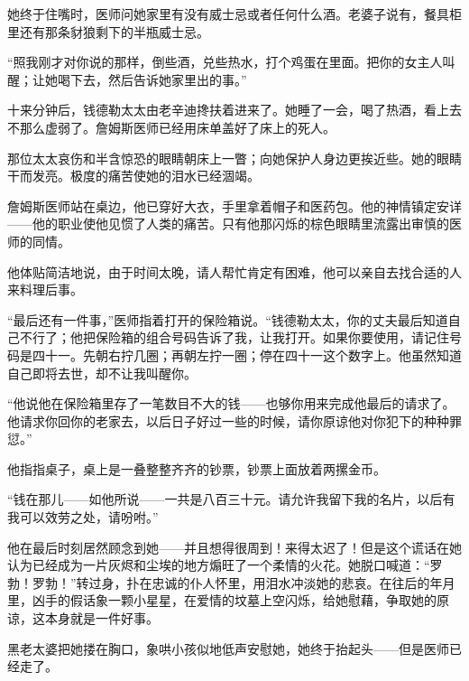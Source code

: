 \documentclass{article}
\begin{document}
她终于住嘴时，医师问她家里有没有威士忌或者任何什么酒。老婆子说有，餐具柜里还有那条豺狼剩下的半瓶威士忌。



“照我刚才对你说的那样，倒些酒，兑些热水，打个鸡蛋在里面。把你的女主人叫醒；让她喝下去，然后告诉她家里出的事。”



十来分钟后，钱德勒太太由老辛迪搀扶着进来了。她睡了一会，喝了热酒，看上去不那么虚弱了。詹姆斯医师已经用床单盖好了床上的死人。



那位太太哀伤和半含惊恐的眼睛朝床上一瞥；向她保护人身边更挨近些。她的眼睛干而发亮。极度的痛苦使她的泪水已经涸竭。



詹姆斯医师站在桌边，他已穿好大衣，手里拿着帽子和医药包。他的神情镇定安详——他的职业使他见惯了人类的痛苦。只有他那闪烁的棕色眼睛里流露出审慎的医师的同情。



他体贴简洁地说，由于时间太晚，请人帮忙肯定有困难，他可以亲自去找合适的人来料理后事。



“最后还有一件事，”医师指着打开的保险箱说。“钱德勒太太，你的丈夫最后知道自己不行了；他把保险箱的组合号码告诉了我，让我打开。如果你要使用，请记住号码是四十一。先朝右拧几圈；再朝左拧一圈；停在四十一这个数字上。他虽然知道自己即将去世，却不让我叫醒你。



“他说他在保险箱里存了一笔数目不大的钱——也够你用来完成他最后的请求了。他请求你回你的老家去，以后日子好过一些的时候，请你原谅他对你犯下的种种罪愆。”



他指指桌子，桌上是一叠整整齐齐的钞票，钞票上面放着两摞金币。



“钱在那儿——如他所说——一共是八百三十元。请允许我留下我的名片，以后有我可以效劳之处，请吩咐。”



他在最后时刻居然顾念到她——并且想得很周到！来得太迟了！但是这个谎话在她认为已经成为一片灰烬和尘埃的地方煽旺了一个柔情的火花。她脱口喊道：“罗勃！罗勃！”转过身，扑在忠诚的仆人怀里，用泪水冲淡她的悲哀。在往后的年月里，凶手的假话象一颗小星星，在爱情的坟墓上空闪烁，给她慰藉，争取她的原谅，这本身就是一件好事。



黑老太婆把她搂在胸口，象哄小孩似地低声安慰她，她终于抬起头——但是医师已经走了。
\end{document}
